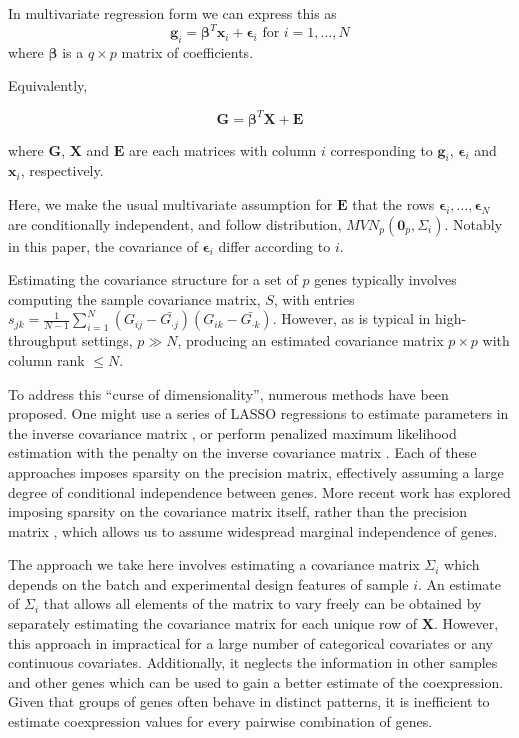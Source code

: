 In multivariate regression form we can express this as 
\[
\textbf{g}_{i}=\mathbf{\beta}^{T}\textbf{x}_{i}+\mathbf{\epsilon}_{i}\text{ for }i=1,\dots,N
\]
 where $\mathbf{\beta}$ is a $q\times p$ matrix of coefficients.

Equivalently,

\[
\textbf{G}=\mathbf{\beta}^T\textbf{X}+\mathbf{E}
\]

where $\textbf{G}$, $\textbf{X}$ and $\textbf{E}$ are each matrices
with column $i$ corresponding to $\textbf{g}_{i}$, $\mathbf{\epsilon}_{i}$ and $\mathbf{x}_{i}$, respectively.

Here, we make the usual multivariate assumption for $\textbf{E}$
that the rows $\mathbf{\epsilon}_{i},\dots,\mathbf{\epsilon}_{N}$
are conditionally independent, and follow distribution, $MVN_{p}(\mathbf{0}_{p},\Sigma_{i})$.
Notably in this paper, the covariance of $\mathbf{\epsilon}_{i}$
differ according to $i$.

Estimating the covariance structure for a set of $p$ genes typically
involves computing the sample covariance matrix, $S$, with entries
$s_{jk}=\frac{1}{N-1}\sum_{i=1}^{N}(G_{ij}-\bar{G_{\cdot j}})(G_{ik}-\bar{G_{\cdot k}})$.
However, as is typical in high-throughput settings, $p\gg N$, producing
an estimated covariance matrix $p\times p$ with column rank $\le N$.

To address this ``curse of dimensionality'',
numerous methods have been proposed. One might use a series of LASSO
regressions to estimate parameters in the inverse covariance matrix
\cite{meinshausen2006high}, or perform penalized maximum likelihood
estimation with the penalty on the inverse covariance matrix \cite{banerjee2008model,yuan2007model,friedman2008sparse}.
Each of these approaches imposes sparsity on the precision matrix,
effectively assuming a large degree of conditional independence between
genes. More recent work has explored imposing sparsity on the covariance
matrix itself, rather than the precision matrix \cite{bien2011sparse},
which allows us to assume widespread marginal independence of genes. 

The approach we take here involves estimating a covariance matrix
$\Sigma_{i}$ which depends on the batch and experimental design features
of sample $i$. An estimate of $\Sigma_{i}$ that allows all elements
of the matrix to vary freely can be obtained by separately estimating
the covariance matrix for each unique row of $\mathbf{X}$. However,
this approach in impractical for a large number of categorical covariates
or any continuous covariates. Additionally, it neglects the information
in other samples and other genes which can be used to gain a better
estimate of the coexpression. Given that groups of genes often behave
in distinct patterns, it is inefficient to estimate coexpression values
for every pairwise combination of genes.


